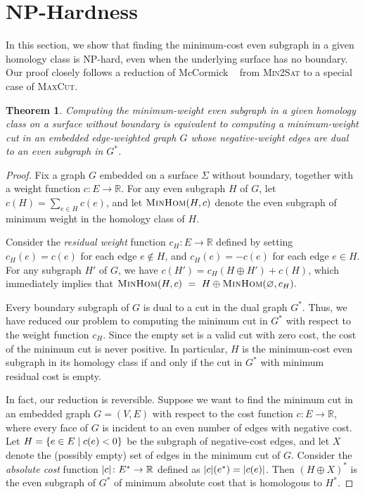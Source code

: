 \documentclass[11pt,twoside]{article}
\def\Real{\mathbb{R}}
\newtheorem{theorem}{Theorem}[section]
\begin{document}
{%
\section{{NP}-Hardness}
\label{S:NPhard}


In this section, we show that finding the minimum-cost even subgraph in a given homology class is {NP}-hard, even when the underlying surface has no boundary.  Our proof closely follows a reduction of McCormick \etal~\cite{mrr-edofm-03} from \textsc{Min2Sat} to a special case of \textsc{MaxCut}.

\begin{theorem}
Computing the minimum-weight even subgraph in a given homology class on a surface without boundary is equivalent to computing a minimum-weight cut in an embedded edge-weighted graph $G$ whose negative-weight edges are dual to an even subgraph in $G^*$.
\end{theorem}

\begin{proof}
Fix a graph $G$ embedded on a surface $\Sigma$ without boundary, together with a weight function $c\colon E\to \Real$.  For any even subgraph $H$ of $G$, let $c(H) = \sum_{e\in H} c(e)$, and let $\textsc{MinHom}(H,c)$ denote the even subgraph of minimum weight in the homology class of $H$.

Consider the \emph{residual weight} function $c_H\colon E\to \Real$ defined by setting $c_H(e) = c(e)$ for each edge $e\not\in H$, and $c_H(e) = -c(e)$ for each edge $e\in H$.  For any subgraph $H'$ of $G$, we have $c(H') = c_H(H\oplus H') + c(H)$, which immediately implies that
\(
    \textsc{MinHom}(H,c) ~=~
    H \oplus \textsc{MinHom}(\varnothing, c_H).
\)

Every boundary subgraph of $G$ is dual to a cut in the dual graph $G^*$.  Thus, we have reduced our problem to computing the minimum cut in $G^*$ with respect to the weight function $c_H$.  Since the empty set is a valid cut with zero cost, the cost of the minimum cut is never positive.  In particular, $H$ is the minimum-cost even subgraph in its homology class if and only if the cut in $G^*$ with minimum residual cost is empty.

In fact, our reduction is reversible.  Suppose we want to find the minimum cut in an embedded graph $G = (V, E)$ with respect to the cost function $c\colon E\to \Real$, where every face of $G$ is incident to an even number of edges with negative cost.  Let $H = \{ {e\in E}\mid {c(e)<0} \}$ be the subgraph of negative-cost edges, and let $X$ denote the (possibly empty) set of edges in the minimum cut of $G$.  Consider the \emph{absolute cost} function $\abs{c}\colon E^*\to \Real$ defined as $\mathopen| c \mathclose|(e^*) = \mathopen| c(e) \mathclose|$.  Then $(H\oplus X)^*$ is the even subgraph of $G^*$ of minimum absolute cost that is homologous to $H^*$.
\end{proof}

}
\end{document}
